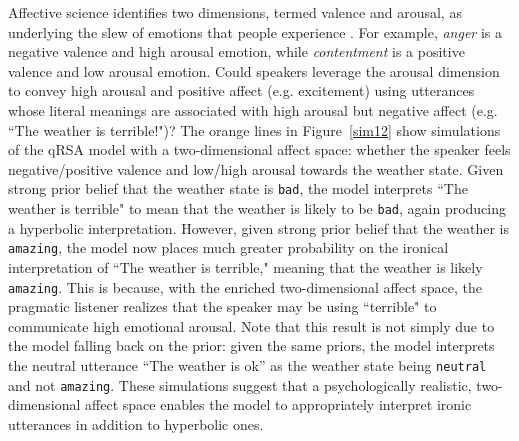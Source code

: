 \documentclass[10pt,letterpaper]{article}
\begin{document}
Affective science identifies two dimensions, termed valence and arousal, as underlying the slew of emotions that people experience \cite{russell1980circumplex}. 
For example, \emph{anger} is a negative valence and high arousal emotion, while \emph{contentment} is a positive valence and low arousal emotion. 
Could speakers leverage the arousal dimension to convey high arousal and positive affect (e.g. excitement) using utterances whose literal meanings are associated with high arousal but negative affect (e.g. ``The weather is terrible!")? The orange lines in Figure~\ref{sim12} show simulations of the qRSA model with a two-dimensional affect space: whether the speaker feels negative/positive valence and low/high arousal towards the weather state. Given strong prior belief that the weather state is \texttt{bad}, the model interprets ``The weather is terrible" to mean that the weather is likely to be \texttt{bad}, again producing a hyperbolic interpretation. However, given strong prior belief that the weather is \texttt{amazing}, the model now places much greater probability on the ironical interpretation of ``The weather is terrible," meaning that the weather is likely \texttt{amazing}. This is because, with the enriched two-dimensional affect space, the pragmatic listener realizes that the speaker may be using ``terrible" to communicate high emotional arousal. Note that this result is not simply due to the model falling back on the prior: given the same priors, the model interprets the neutral utterance ``The weather is ok'' as the weather state being \texttt{neutral} and not \texttt{amazing}.
These simulations suggest that a psychologically realistic, two-dimensional affect space enables the model to appropriately interpret ironic utterances in addition to hyperbolic ones. 

\end{document}
